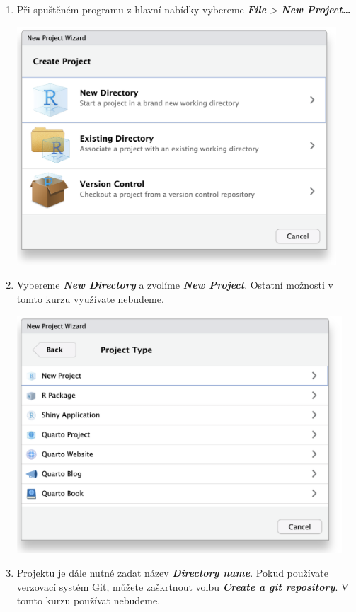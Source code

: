 \documentclass[
  letterpaper,
  DIV=11,
  numbers=noendperiod]{scrreprt}
\begin{document}
\begin{enumerate}
\def\labelenumi{\arabic{enumi}.}
\item
  Při spuštěném programu z hlavní nabídky vybereme \emph{\textbf{File}
  \textgreater{} \textbf{New Project\ldots{}}}

  \includegraphics[width=4.69792in,height=\textheight]{images/new_project.png}
\item
  Vybereme \textbf{\emph{New Directory}} a zvolíme \textbf{\emph{New
  Project}}. Ostatní možnosti v tomto kurzu využívate nebudeme.

  \includegraphics[width=4.78125in,height=\textheight]{images/new_directory.png}
\item
  Projektu je dále nutné zadat název \textbf{\emph{Directory name}}.
  Pokud používate verzovací systém Git, můžete zaškrtnout volbu
  \textbf{\emph{Create a git repository}}. V tomto kurzu používat
  nebudeme.


\end{enumerate}
\end{document}

